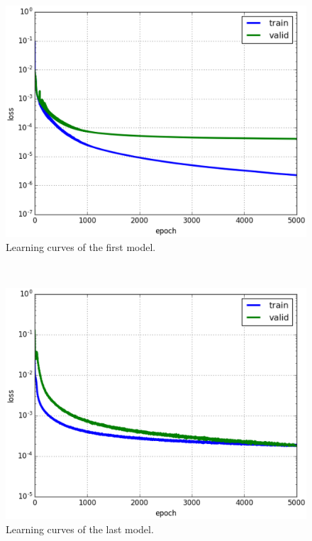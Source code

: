 \documentclass[conference]{IEEEtran}
\begin{document}
\begin{figure}[h!]
	\centerline{\includegraphics[scale=0.43]{images/loss_model_1.eps}}
	\caption{Learning curves of the first model.}
	\label{figloss1}
\end{figure}~\\
\begin{figure}[h!]
	\centerline{\includegraphics[scale=0.43]{images/loss_v16.eps}}
	\caption{Learning curves of the last model.}
	\label{figloss}
\end{figure}
\end{document}
